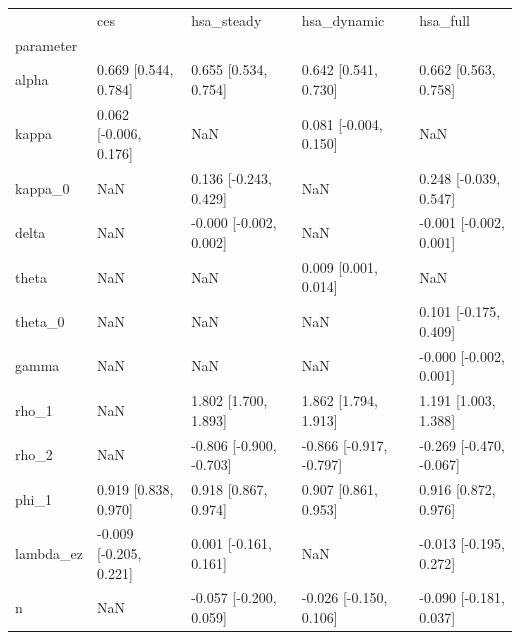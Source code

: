 \begin{tabular}{lllll}
\toprule
 & ces & hsa\_steady & hsa\_dynamic & hsa\_full \\
parameter &  &  &  &  \\
\midrule
alpha & 0.669 [0.544, 0.784] & 0.655 [0.534, 0.754] & 0.642 [0.541, 0.730] & 0.662 [0.563, 0.758] \\
kappa & 0.062 [-0.006, 0.176] & NaN & 0.081 [-0.004, 0.150] & NaN \\
kappa\_0 & NaN & 0.136 [-0.243, 0.429] & NaN & 0.248 [-0.039, 0.547] \\
delta & NaN & -0.000 [-0.002, 0.002] & NaN & -0.001 [-0.002, 0.001] \\
theta & NaN & NaN & 0.009 [0.001, 0.014] & NaN \\
theta\_0 & NaN & NaN & NaN & 0.101 [-0.175, 0.409] \\
gamma & NaN & NaN & NaN & -0.000 [-0.002, 0.001] \\
rho\_1 & NaN & 1.802 [1.700, 1.893] & 1.862 [1.794, 1.913] & 1.191 [1.003, 1.388] \\
rho\_2 & NaN & -0.806 [-0.900, -0.703] & -0.866 [-0.917, -0.797] & -0.269 [-0.470, -0.067] \\
phi\_1 & 0.919 [0.838, 0.970] & 0.918 [0.867, 0.974] & 0.907 [0.861, 0.953] & 0.916 [0.872, 0.976] \\
lambda\_ez & -0.009 [-0.205, 0.221] & 0.001 [-0.161, 0.161] & NaN & -0.013 [-0.195, 0.272] \\
n & NaN & -0.057 [-0.200, 0.059] & -0.026 [-0.150, 0.106] & -0.090 [-0.181, 0.037] \\
\bottomrule
\end{tabular}
